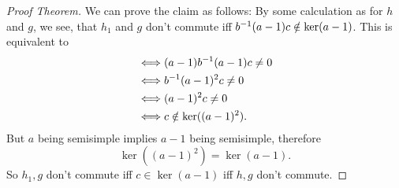 \begin{proof}[Proof Theorem]
We can prove the claim as follows: By some calculation as for $h$ and $g$, we see, that $h_1$ and $g$ don't commute iff $b^{-1}(a-1)c \notin \ker(a-1)$. This is equivalent to
\begin{align*}
\iff & (a-1)b^{-1}(a-1)c \neq 0\\
\iff & b^{-1}(a-1)^2c \neq 0\\
\iff & (a-1)^2c \neq 0\\
\iff & c \notin \ker((a-1)^2).
\end{align*}
But $a$ being semisimple implies $a-1$ being semisimple, therefore
\[ \ker((a-1)^2) = \ker(a-1).\]
So $h_1,g$ don't commute iff $c \in \ker(a-1) $ iff $h,g$ don't commute.
\end{proof}